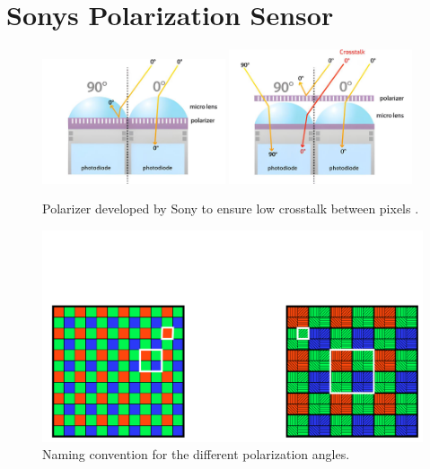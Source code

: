 \section{Sonys Polarization Sensor}
\begin{figure}[H]
    \centering
    \includegraphics[width=0.48\textwidth]{figures/crosstalk_off_upscaled.jpg}
    \includegraphics[width=0.48\textwidth]{figures/crosstalk_upscaled.jpg}
    \caption{Polarizer developed by Sony to ensure low crosstalk between pixels \cite{lucidvisionlabsPolarizationExplainedSony2018}.}
    \label{fig:camera_crosstalk}
\end{figure}

\begin{figure}[H]
    \centering
    \includegraphics[width=\textwidth]{figures/polarized_image/naming.pdf}
    \caption{Naming convention for the different polarization angles.}
    \label{fig:polarization_naming}
\end{figure}
